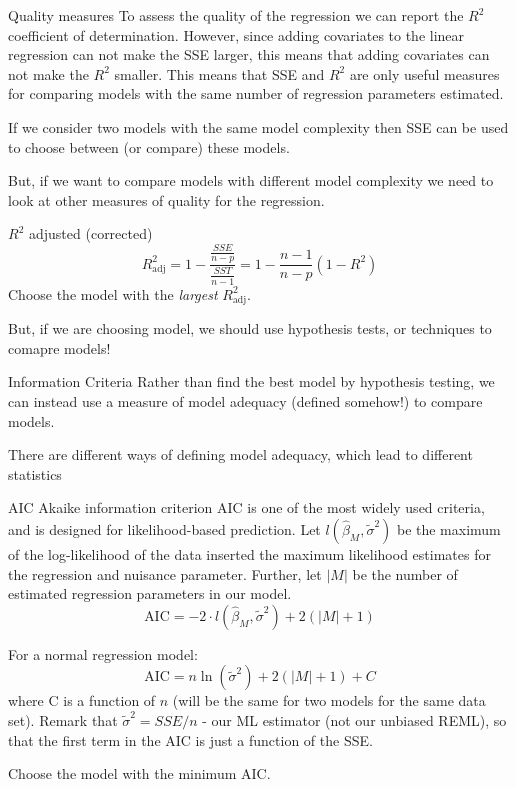 \documentclass[
  ignorenonframetext,
]{beamer}
\begin{document}
\begin{frame}{Quality measures}
\label{quality-measures}
To assess the quality of the regression we can report the \(R^2\)
coefficient of determination. However, since adding covariates to the
linear regression can not make the SSE larger, this means that adding
covariates can not make the \(R^2\) smaller. This means that SSE and
\(R^2\) are only useful measures for comparing models with the same
number of regression parameters estimated.

If we consider two models with the same model complexity then SSE can be
used to choose between (or compare) these models.

But, if we want to compare models with different model complexity we
need to look at other measures of quality for the regression.
\end{frame}

\begin{frame}{\(R^2\) adjusted (corrected)}
\label{r2-adjusted-corrected}
\[R^2_{\text{adj}}=1-\frac{\frac{SSE}{n-p}}{\frac{SST}{n-1}}=1-\frac{n-1}{n-p}(1-R^2)\]
Choose the model with the \emph{largest} \(R^2_{\text{adj}}\).

But, if we are choosing model, we should use hypothesis tests, or
techniques to comapre models!
\end{frame}

\begin{frame}{Information Criteria}
\label{information-criteria}
Rather than find the best model by hypothesis testing, we can instead
use a measure of model adequacy (defined somehow!) to compare models.

There are different ways of defining model adequacy, which lead to
different statistics
\end{frame}

\begin{frame}{AIC Akaike information criterion}
\label{aic-akaike-information-criterion}
AIC is one of the most widely used criteria, and is designed for
likelihood-based prediction. Let \(l(\hat{\beta}_M,\tilde{\sigma}^2)\)
be the maximum of the log-likelihood of the data inserted the maximum
likelihood estimates for the regression and nuisance parameter. Further,
let \(\lvert M \rvert\) be the number of estimated regression parameters
in our model.
\[\text{AIC} =-2 \cdot l(\hat{\beta}_M,\tilde{\sigma}^2)+2(\lvert M\rvert +1)\]

For a normal regression model:
\[\text{AIC} =n\ln(\tilde{\sigma}^2)+2(\lvert M\rvert +1)+C\] where C is
a function of \(n\) (will be the same for two models for the same data
set). Remark that \(\tilde{\sigma}^2=SSE/n\) - our ML estimator (not our
unbiased REML), so that the first term in the AIC is just a function of
the SSE.

Choose the model with the minimum AIC.
\end{frame}
\end{document}
